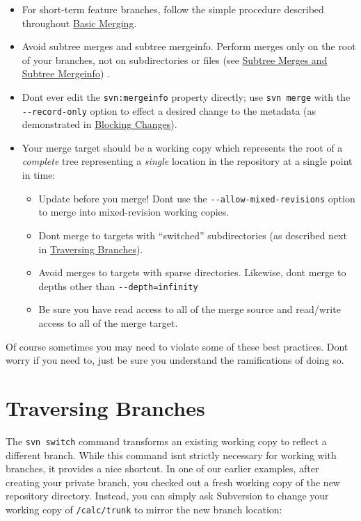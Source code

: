 \begin{itemize}
\item
  For short-term feature branches, follow the simple procedure described
  throughout \hyperref[svn.branchmerge.basicmerging]{Basic Merging}.
\item
  Avoid subtree merges and subtree mergeinfo. Perform merges only on the
  root of your branches, not on subdirectories or files (see
  \hyperref[svn.branchmerge.basicmerging.stayinsync.subtree]{Subtree
  Merges and Subtree Mergeinfo}) .
\item
  Don\textquotesingle t ever edit the \texttt{svn:mergeinfo} property
  directly; use \texttt{svn\ merge} with the \texttt{-\/-record-only}
  option to effect a desired change to the metadata (as demonstrated in
  \hyperref[svn.branchmerge.advanced.blockchanges]{Blocking Changes}).
\item
  Your merge target should be a working copy which represents the root
  of a \emph{complete} tree representing a \emph{single} location in the
  repository at a single point in time:

  \begin{itemize}
  \item
    Update before you merge! Don\textquotesingle t use the
    \texttt{-\/-allow-mixed-revisions} option to merge into
    mixed-revision working copies.
  \item
    Don\textquotesingle t merge to targets with ``switched''
    subdirectories (as described next in
    \hyperref[svn.branchmerge.switchwc]{Traversing Branches}).
  \item
    Avoid merges to targets with sparse directories. Likewise,
    don\textquotesingle t merge to depths other than
    \texttt{-\/-depth=infinity}
  \item
    Be sure you have read access to all of the merge source and
    read/write access to all of the merge target.
  \end{itemize}
\end{itemize}

Of course sometimes you may need to violate some of these best
practices. Don\textquotesingle t worry if you need to, just be sure you
understand the ramifications of doing so.

\section{Traversing Branches}\label{svn.branchmerge.switchwc}

The \texttt{svn\ switch} command transforms an existing working copy to
reflect a different branch. While this command isn\textquotesingle t
strictly necessary for working with branches, it provides a nice
shortcut. In one of our earlier examples, after creating your private
branch, you checked out a fresh working copy of the new repository
directory. Instead, you can simply ask Subversion to change your working
copy of \texttt{/calc/trunk} to mirror the new branch location:

